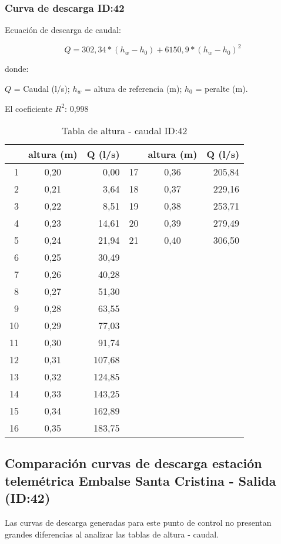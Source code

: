 \documentclass[]{article}
\begin{document}
\clearpage

\subsubsection{Curva de descarga ID:42}\label{ID:42}

Ecuación de descarga de caudal:

\[Q = 302,34*(h_w - h_0) + 6150,9*{(h_w - h_0)^2}\]

donde:

\(Q\) = Caudal (l/s); \(h_w\) = altura de referencia (m); \(h_0\) =
peralte (m).

El coeficiente \(R^2\): 0,998


\begin{table}[H]

\caption{Tabla de altura - caudal ID:42}
\centering

\begin{center}
\begingroup\fontsize{10pt}{11pt}\selectfont
\begin{tabular}{rcrrcr}
  \hline
 & altura (m) & Q (l/s) &  & altura (m) & Q (l/s) \\ 
  \hline
  1 & 0,20 & 0,00 &  17 & 0,36 & 205,84 \\ 
    2 & 0,21 & 3,64 &  18 & 0,37 & 229,16 \\ 
    3 & 0,22 & 8,51 &  19 & 0,38 & 253,71 \\ 
    4 & 0,23 & 14,61 &  20 & 0,39 & 279,49 \\ 
    5 & 0,24 & 21,94 &  21 & 0,40 & 306,50 \\ 
    6 & 0,25 & 30,49 &  &  &  \\ 
    7 & 0,26 & 40,28 &  &  &  \\ 
    8 & 0,27 & 51,30 &  &  &  \\ 
    9 & 0,28 & 63,55 &  &  &  \\ 
   10 & 0,29 & 77,03 &  &  &  \\ 
   11 & 0,30 & 91,74 &  &  &  \\ 
   12 & 0,31 & 107,68 &  &  &  \\ 
   13 & 0,32 & 124,85 &  &  &  \\ 
   14 & 0,33 & 143,25 &  &  &  \\ 
   15 & 0,34 & 162,89 &  &  &  \\ 
   16 & 0,35 & 183,75 &  &  &  \\ 
   \hline
\end{tabular}
\endgroup\end{center}
\end{table}

\subsection{Comparación curvas de descarga estación telemétrica Embalse Santa Cristina - Salida (ID:42)}\label{comparación curvas}

Las curvas de descarga generadas para este punto de control no presentan grandes diferencias al analizar las tablas de altura - caudal.
\end{document}
